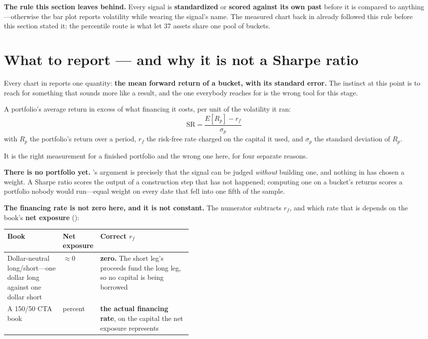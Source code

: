 \textbf{The rule this section leaves behind.} Every signal is \textbf{standardized} or \textbf{scored
against its own past} before it is compared to anything---otherwise the bar plot reports volatility
while wearing the signal's name. The measured chart back in  already
followed this rule before this section stated it: the percentile route is what let 37 assets share
one pool of buckets.


\section{What to report --- and why it is not a Sharpe ratio}\label{sec:what-to-report}

Every chart in  reports one quantity: \textbf{the mean forward return of a
bucket, with its standard error.} The instinct at this point is to reach for something that sounds
more like a result, and the one everybody reaches for is the wrong tool for this stage.

\begin{definition}\label{def:sharpe}
A portfolio's average return in excess of what financing it costs, per unit of the volatility it
ran:
\[
  \mathrm{SR} = \frac{E[R_p] - r_f}{\sigma_p}
\]
with $R_p$ the portfolio's return over a period, $r_f$ the risk-free rate charged on the capital it
used, and $\sigma_p$ the standard deviation of $R_p$.
\end{definition}

It is the right measurement for a finished portfolio and the wrong one here, for four separate
reasons.

\textbf{There is no portfolio yet.} 's argument is precisely that
the signal can be judged \emph{without} building one, and nothing in  has
chosen a weight. A Sharpe ratio scores the output of a construction step that has not happened;
computing one on a bucket's returns scores a portfolio nobody would run---equal weight on every date
that fell into one fifth of the sample.

\textbf{The financing rate is not zero here, and it is not constant.} The numerator subtracts $r_f$,
and which rate that is depends on the book's \textbf{net exposure}
():

\begin{tabularx}{\linewidth}{|>{\raggedright\arraybackslash}p{0.30\linewidth}|>{\raggedright\arraybackslash}p{0.14\linewidth}|X|}
\hline
\textbf{Book} & \textbf{Net exposure} & \textbf{Correct $r_f$} \\ \hline
Dollar-neutral long/short---one dollar long against one dollar short
  & $\approx 0$
  & \textbf{zero.} The short leg's proceeds fund the long leg, so no capital is being
    borrowed \\ \hline
A 150/50 CTA book
  & 100 percent
  & \textbf{the actual financing rate}, on the capital the net exposure represents \\ \hline
\end{tabularx}


